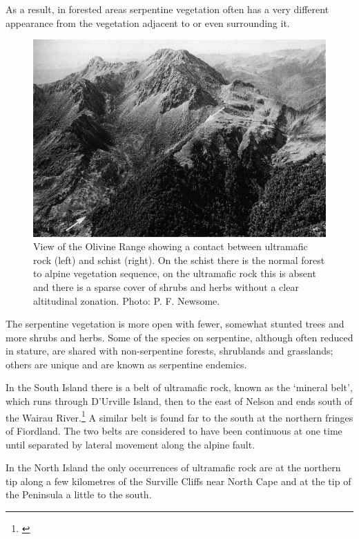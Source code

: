 As a result, in forested areas serpentine vegetation often has a very different appearance from the vegetation adjacent to or even surrounding it.
\begin{figure}[!b]
	\includegraphics[width=\textwidth]{graphics/figure89olivine-range.jpg}
	\centering
	\caption[View of the Olivine Range]{View of the Olivine Range showing a contact between ultramafic rock (left) and schist (right).
	On the schist there is the normal forest to alpine vegetation sequence, on the ultramafic rock this is absent and there is a sparse cover of shrubs and herbs without a clear altitudinal zonation.
	Photo: P. F. Newsome.}%
	\label{fig:89olivine-range}
\end{figure}
The serpentine vegetation is more open with fewer, somewhat stunted trees and more shrubs and herbs.
Some of the species on serpentine, although often reduced in stature, are shared with non-serpentine forests, shrublands and grasslands; others are unique and are known as serpentine endemics.

In the South Island there is a belt of ultramafic rock, known as the `mineral belt', which runs through D'Urville Island, then to the east of Nelson and ends south of the Wairau River.\footnote{\cite{betts1918notes}}
A similar belt is found far to the south at the northern fringes of Fiordland.
The two belts are considered to have been continuous at one time until separated by lateral movement along the alpine fault.

In the North Island the only occurrences of ultramafic rock are at the northern tip along a few kilometres of the Surville Cliffs near North Cape and at the tip of the Peninsula a little to the south.

